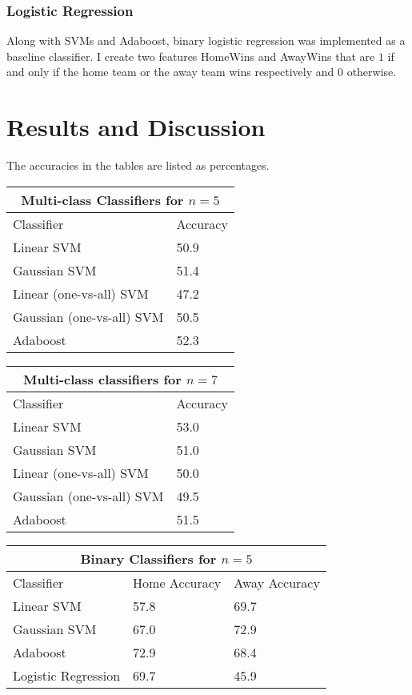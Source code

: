 \documentclass[paper=a4, fontsize=11pt]{scrartcl}
\numberwithin{equation}{section}		%
\numberwithin{figure}{section}			%
\numberwithin{table}{section}				%
\begin{document}
\subsubsection{Logistic Regression}

Along with SVMs and Adaboost, binary logistic regression was implemented as a baseline classifier. I create two features HomeWins and AwayWins that are $1$ if and only if the home team or the away team wins respectively and $0$ otherwise.

\section{Results and Discussion}

The accuracies in the tables are listed as percentages.

\begin{tabular}{ |p{5cm}||p{5cm}|  }
 \hline
 \multicolumn{2}{|c|}{Multi-class Classifiers for $n=5$} \\
 \hline
Classifier & Accuracy \\
 \hline
 Linear SVM   & 50.9 \\
 Gaussian SVM &   51.4 \\
 Linear (one-vs-all) SVM & 47.2 \\
 Gaussian (one-vs-all) SVM    & 50.5 \\
 Adaboost & 52.3 \\
 \hline
\end{tabular}

\begin{tabular}{ |p{5cm}||p{5cm}|  }
 \hline
 \multicolumn{2}{|c|}{Multi-class classifiers for $n=7$} \\
 \hline
Classifier & Accuracy \\
 \hline
 Linear SVM   & 53.0 \\
 Gaussian SVM &   51.0 \\
 Linear (one-vs-all) SVM & 50.0 \\
 Gaussian (one-vs-all) SVM    & 49.5 \\
 Adaboost & 51.5 \\
 \hline
\end{tabular}

\begin{tabular}{ |p{4cm}||p{4cm}|p{4cm}|  }
 \hline
 \multicolumn{3}{|c|}{Binary Classifiers for $n=5$} \\
 \hline
Classifier & Home Accuracy & Away Accuracy \\
 \hline
 Linear SVM   & 57.8 & 69.7 \\
 Gaussian SVM &   67.0 & 72.9 \\
 Adaboost & 72.9 & 68.4 \\
 Logistic Regression & 69.7 & 45.9 \\
 \hline
\end{tabular}
\end{document}
